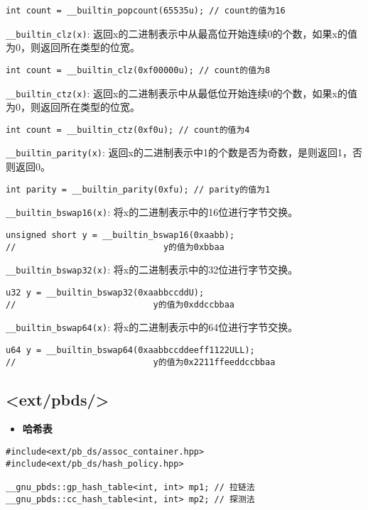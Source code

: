 \documentclass[a4paper,landscape,twocolumn]{ctexart}
\newcommand{\point}[1]{
	\begin{itemize}
		\item \textbf{#1}
	\end{itemize}
}
\begin{document}
\begin{lstlisting}
int count = __builtin_popcount(65535u); // count的值为16
\end{lstlisting}

\texttt{\_\_builtin\_clz(x)}: 返回x的二进制表示中从最高位开始连续0的个数，如果x的值为0，则返回所在类型的位宽。

\begin{lstlisting}
int count = __builtin_clz(0xf00000u); // count的值为8
\end{lstlisting}

\texttt{\_\_builtin\_ctz(x)}: 返回x的二进制表示中从最低位开始连续0的个数，如果x的值为0，则返回所在类型的位宽。

\begin{lstlisting}
int count = __builtin_ctz(0xf0u); // count的值为4
\end{lstlisting}

\texttt{\_\_builtin\_parity(x)}: 返回x的二进制表示中1的个数是否为奇数，是则返回1，否则返回0。

\begin{lstlisting}
int parity = __builtin_parity(0xfu); // parity的值为1
\end{lstlisting}

\texttt{\_\_builtin\_bswap16(x)}: 将x的二进制表示中的16位进行字节交换。
\begin{lstlisting}
unsigned short y = __builtin_bswap16(0xaabb);
//                             y的值为0xbbaa
\end{lstlisting}

\texttt{\_\_builtin\_bswap32(x)}: 将x的二进制表示中的32位进行字节交换。

\begin{lstlisting}
u32 y = __builtin_bswap32(0xaabbccddU);
//                           y的值为0xddccbbaa
\end{lstlisting}

\texttt{\_\_builtin\_bswap64(x)}: 将x的二进制表示中的64位进行字节交换。
\begin{lstlisting}
u64 y = __builtin_bswap64(0xaabbccddeeff1122ULL);
//                           y的值为0x2211ffeeddccbbaa
\end{lstlisting}

\subsection{<ext/pbds/>}

\point{哈希表}

\begin{lstlisting}
#include<ext/pb_ds/assoc_container.hpp>
#include<ext/pb_ds/hash_policy.hpp>

__gnu_pbds::gp_hash_table<int, int> mp1; // 拉链法
__gnu_pbds::cc_hash_table<int, int> mp2; // 探测法
\end{lstlisting}
\end{document}
